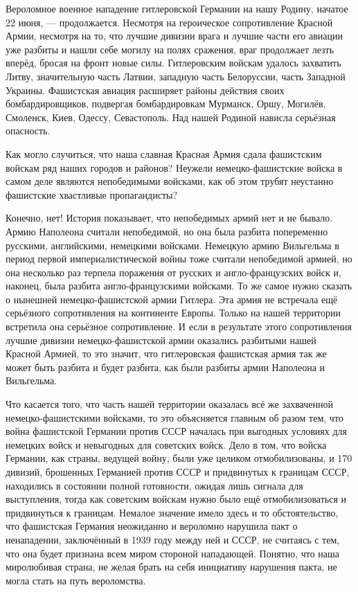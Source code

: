 \documentclass[12pt, a4paper, openany]{book}
\begin{document}
Вероломное военное нападение гитлеровской Германии на нашу Родину, начатое 22 июня, — продолжается. Несмотря на героическое сопротивление Красной Армии, несмотря на то, что лучшие дивизии врага и лучшие части его авиации уже разбиты и нашли себе могилу на полях сражения, враг продолжает лезть вперёд, бросая на фронт новые силы. Гитлеровским войскам удалось захватить Литву, значительную часть Латвии, западную часть Белоруссии, часть Западной Украины. Фашистская авиация расширяет районы действия своих бомбардировщиков, подвергая бомбардировкам Мурманск, Оршу, Могилёв, Смоленск, Киев, Одессу, Севастополь. Над нашей Родиной нависла серьёзная опасность.

Как могло случиться, что наша славная Красная Армия сдала фашистским войскам ряд наших городов и районов? Неужели немецко-фашистские войска в самом деле являются непобедимыми войсками, как об этом трубят неустанно фашистские хвастливые пропагандисты?

Конечно, нет! История показывает, что непобедимых армий нет и не бывало. Армию Наполеона считали непобедимой, но она была разбита попеременно русскими, английскими, немецкими войсками. Немецкую армию Вильгельма в период первой империалистической войны тоже считали непобедимой армией, но она несколько раз терпела поражения от русских и англо-французских войск и, наконец, была разбита англо-французскими войсками. То же самое нужно сказать о нынешней немецко-фашистской армии Гитлера. Эта армия не встречала ещё серьёзного сопротивления на континенте Европы. Только на нашей территории встретила она серьёзное сопротивление. И если в результате этого сопротивления лучшие дивизии немецко-фашистской армии оказались разбитыми нашей Красной Армией, то это значит, что гитлеровская фашистская армия так же может быть разбита и будет разбита, как были разбиты армии Наполеона и Вильгельма.

Что касается того, что часть нашей территории оказалась всё же захваченной немецко-фашистскими войсками, то это объясняется главным об разом тем, что война фашистской Германии против СССР началась при выгодных условиях для немецких войск и невыгодных для советских войск. Дело в том, что войска Германии, как страны, ведущей войну, были уже целиком отмобилизованы, и 170 дивизий, брошенных Германией против СССР и придвинутых к границам СССР, находились в состоянии полной готовности, ожидая лишь сигнала для выступления, тогда как советским войскам нужно было ещё отмобилизоваться и придвинуться к границам. Немалое значение имело здесь и то обстоятельство, что фашистская Германия неожиданно и вероломно нарушила пакт о ненападении, заключённый в 1939 году между ней и СССР, не считаясь с тем, что она будет признана всем миром стороной нападающей. Понятно, что наша миролюбивая страна, не желая брать на себя инициативу нарушения пакта, не могла стать на путь вероломства.
\end{document}
